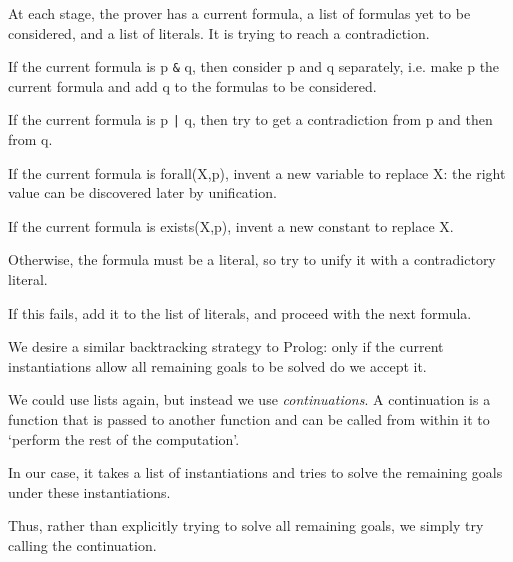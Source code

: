 \begin{slide*}


\vspace*{0.5cm}

At each stage, the prover has a current formula, a list of formulas yet to be
considered, and a list of literals. It is trying to reach a contradiction.

If the current formula is {\black p {\verb+&+} q}, then consider {\black p} and
{\black q} separately, i.e. make {\black p} the current formula and add {\black
q} to the formulas to be considered.

If the current formula is {\black p {\verb+|+} q}, then try to get a
contradiction from {\black p} and then from {\black q}.

If the current formula is {\black forall(X,p)}, invent a new variable to
replace {\black X}: the right value can be discovered later by unification.

If the current formula is {\black exists(X,p)}, invent a new constant to
replace {\black X}.

Otherwise, the formula must be a literal, so try to unify it with a
contradictory literal.

If this fails, add it to the list of literals, and proceed with the next
formula.

\end{slide*}



\begin{slide*}


\vspace*{0.5cm}

We desire a similar backtracking strategy to Prolog: only if the current
instantiations allow all remaining goals to be solved do we accept it.

We could use lists again, but instead we use {\em continuations}. A
continuation is a function that is passed to another function and can be called
from within it to `perform the rest of the computation'.

In our case, it takes a list of instantiations and tries to solve the remaining
goals under these instantiations.

Thus, rather than explicitly trying to solve all remaining goals, we simply try
calling the continuation.

\end{slide*}




